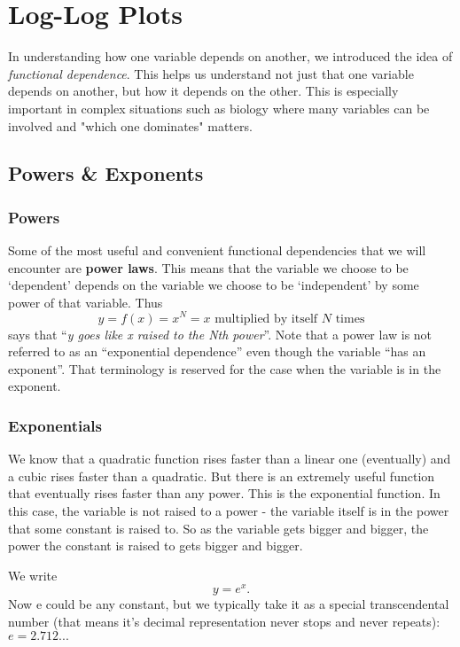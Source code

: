 \chapter{Log-Log Plots}
\thispagestyle{fancy}

In understanding how one variable depends on another, we introduced the idea of \emph{functional dependence}.
This helps us understand not just that one variable depends on another, but how it depends on the other.
This is especially important in complex situations such as biology where many variables can be involved and "which one dominates" matters.

\section{Powers \& Exponents}

\subsection*{Powers}
Some of the most useful and convenient functional dependencies that we will encounter are \textbf{power laws}.
This means that the variable we choose to be `dependent' depends on the variable we choose to be `independent' by some power of that variable.
Thus
\[ y = f(x) = x^{N} = x \text{ multiplied by itself } N \text{ times} \]
says that ``\emph{y goes like x raised to the Nth power}''.
Note that a power law is not referred to as an ``exponential dependence'' even though the variable ``has an exponent''.
That terminology is reserved for the case when the variable is in the exponent.

\subsection*{Exponentials}
We know that a quadratic function rises faster than a linear one (eventually) and a cubic rises faster than a quadratic.
But there is an extremely useful function that eventually rises faster than any power.
This is the exponential function.
In this case, the variable is not raised to a power - the variable itself is in the power that some constant is raised to.
So as the variable gets bigger and bigger, the power the constant is raised to gets bigger and bigger.
\par
We write
\[ y = e^{x} \text{.} \]
Now e could be any constant, but we typically take it as a special transcendental number (that means it's decimal representation never stops and never repeats): $e = 2.712...$

